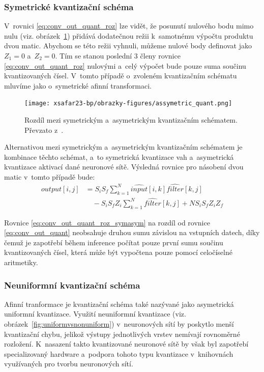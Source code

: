 \subsubsection{Symetrické kvantizační schéma}

V~rovnici \eqref{eq:conv_out_quant_roz} lze vidět, že posunutí nulového bodu mimo nulu (viz. obrázek~\ref{fig:assymetric_quant}) přidává dodatečnou režii k~samotnému výpočtu produktu dvou matic. Abychom se  této režii vyhnuli, můžeme nulové body definovat jako $Z_1 = 0$ a~$Z_2 = 0$. Tím se stanou poslední 3 členy rovnice \eqref{eq:conv_out_quant_roz} nulovými a~celý výpočet bude pouze suma součinu kvantizovaných čísel. V~tomto případě o~zvoleném kvantizačním schématu mluvíme jako o~symetrické afinní transformaci.

\begin{figure}[H]
	\centering
	\texttt{[image: xsafar23-bp/obrazky-figures/assymetric\_quant.png]}
	\caption{Rozdíl mezi symetrickým a~asymetrickým kvantizačním schématem. Převzato z~\cite{gholami2021survey}.}
	\label{fig:assymetric_quant} 
\end{figure}

Alternativou mezi symetrickým a~asymetrickým kvantizačním schématem je kombinace těchto schémat, a~to symetrická kvantizace vah a~asymetrická kvantizace aktivací dané neuronové sítě. Výsledná rovnice pro násobení dvou matic v~tomto případě bude:
\begin{equation}
    \label{eq:conv_out_quant_roz_symasym}
    \begin{split}
    output[i,j] &= S_{i} S_{f} \sum_{k=1}^{N}{\widehat{input}[i,k] \widehat{filter}[k,j]} \\
    &\quad - S_{i} S_{f} Z_i \sum_{k=1}^{N} {\widehat{filter}[k,j]} + N S_{i} S_{f} Z_i Z_f
\end{split}
\end{equation}

Rovnice \eqref{eq:conv_out_quant_roz_symasym} na rozdíl od rovnice \eqref{eq:conv_out_quant} neobsahuje druhou sumu závislou na vstupních datech, díky čemuž je zapotřebí během inference počítat pouze první sumu součinu kvantizovaných čísel, která může být vypočtena pouze pomocí celočíselné aritmetiky.

\subsubsection{Neuniformní kvantizační schéma}

Afinní tranformace je kvantizační schéma také nazývané jako asymetrická uniformní kvantizace. Využití neuniformní kvantizace (viz. obrázek~\ref{fig:uniformvsnonuniform}) v~neuronových sítí by poskytlo menší kvantizační chybu, jelikož výstupy jednotlivých vrstev nemívají rovnoměrné rozložení. K~nasazení takto kvantizované neuronové sítě by však byl zapotřebí specializovaný hardware a~podpora tohoto typu kvantizace v~knihovnách využívaných pro tvorbu neuronových sítí. 

